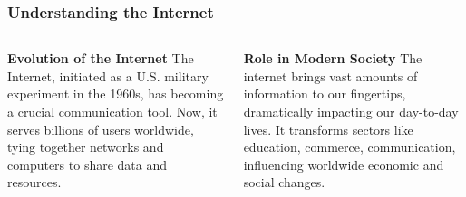 \documentclass[5pt]{beamer}
\begin{document}
\begin{frame}
\frametitle{Understanding the Internet}
\begin{columns}
\begin{column}{0.45\textwidth}
\begin{block}{\textbf{Evolution of the Internet}}
The Internet, initiated as a U.S. military experiment in the 1960s, has becoming a crucial communication tool. Now, it serves billions of users worldwide, tying together networks and computers to share data and resources.
\end{block}
\end{column}
\begin{column}{0.45\textwidth}
\begin{block}{\textbf{Role in Modern Society}}
The internet brings vast amounts of information to our fingertips, dramatically impacting our day-to-day lives. It transforms sectors like education, commerce, communication, influencing worldwide economic and social changes.
\end{block}
\end{column}
\end{columns}
\end{frame}
\end{document}
